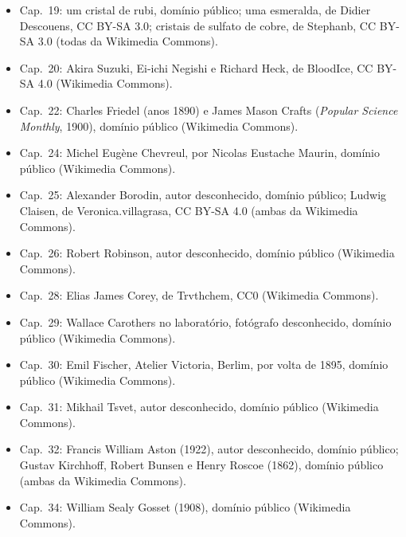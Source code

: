 \begin{itemize}
        público; Alfred Werner, Les Prix Nobel (1914), domínio público (ambas da
        Wikimedia Commons).
  \item Cap.~19: um cristal de rubi, domínio público; uma esmeralda, de Didier
        Descouens, CC BY-SA 3.0; cristais de sulfato de cobre, de Stephanb,
        CC BY-SA 3.0 (todas da Wikimedia Commons).
  \item Cap.~20: Akira Suzuki, Ei-ichi Negishi e Richard Heck, de BloodIce,
        CC BY-SA 4.0 (Wikimedia Commons).
  \item Cap.~22: Charles Friedel (anos 1890) e James Mason Crafts (\textit{Popular
        Science Monthly}, 1900), domínio público (Wikimedia Commons).
  \item Cap.~24: Michel Eug\`ene Chevreul, por Nicolas Eustache Maurin, domínio
        público (Wikimedia Commons).
  \item Cap.~25: Alexander Borodin, autor desconhecido, domínio público; Ludwig
        Claisen, de Veronica.villagrasa, CC BY-SA 4.0 (ambas da Wikimedia Commons).
  \item Cap.~26: Robert Robinson, autor desconhecido, domínio público
        (Wikimedia Commons).
  \item Cap.~28: Elias James Corey, de Trvthchem, CC0 (Wikimedia Commons).
  \item Cap.~29: Wallace Carothers no laboratório, fotógrafo desconhecido,
        domínio público (Wikimedia Commons).
  \item Cap.~30: Emil Fischer, Atelier Victoria, Berlim, por volta de 1895,
        domínio público (Wikimedia Commons).
  \item Cap.~31: Mikhail Tsvet, autor desconhecido, domínio público (Wikimedia
        Commons).
  \item Cap.~32: Francis William Aston (1922), autor desconhecido, domínio
        público; Gustav Kirchhoff, Robert Bunsen e Henry Roscoe (1862), domínio
        público (ambas da Wikimedia Commons).
  \item Cap.~34: William Sealy Gosset (1908), domínio público (Wikimedia
        Commons).
\end{itemize}
\clearpage
